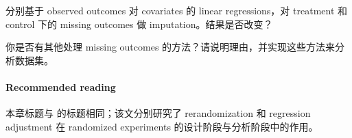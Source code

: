 分别基于 observed outcomes 对 covariates 的 linear regressions，对 treatment 和 control 下的 missing outcomes 做 imputation。结果是否改变？

你是否有其他处理 missing outcomes 的方法？请说明理由，并实现这些方法来分析数据集。

\paragraph{Recommended reading}

本章标题与 \citet{li2019rerandomization} 的标题相同；该文分别研究了 rerandomization 和 regression adjustment 在 randomized experiments 的设计阶段与分析阶段中的作用。

